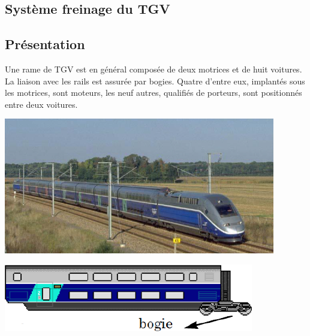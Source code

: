 \documentclass[10pt,fleqn]{article} %
\begin{document}
\def\pathfig{images}

\vspace{4.5cm}
\pagestyle{fancy}
\thispagestyle{plain}

\def\columnseprulecolor{\color{ocre}}
\setlength{\columnseprule}{0.4pt} 

\def\pathfig{images}

\begin{multicols}{2}



\section*{Système freinage du TGV}
\subsection*{Présentation}
Une rame de TGV est en général composée de deux motrices
et de huit voitures.
La liaison avec les rails est assurée par bogies. Quatre
d’entre eux, implantés sous les motrices, sont moteurs, les
neuf autres, qualifiés de porteurs, sont positionnés entre
deux voitures.

\begin{center}
\includegraphics[width=\linewidth]{images/fig_01.png}
\end{center}


\begin{center}
\includegraphics[width=\linewidth]{images/fig_02.png}
\end{center}


\end{multicols}
\end{document}
